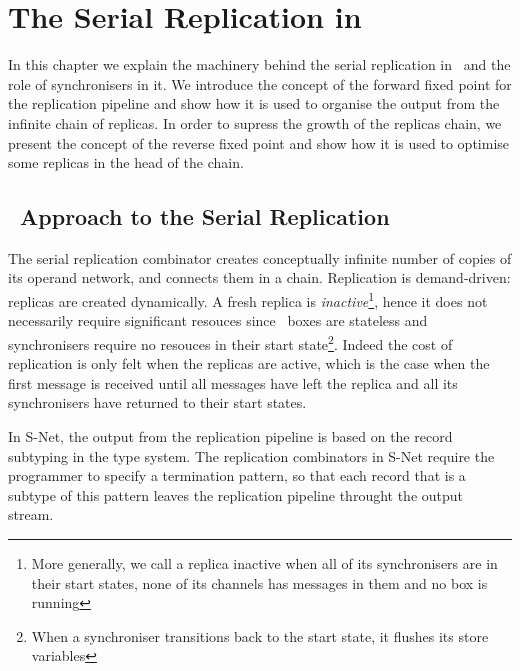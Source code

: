 \chapter{The Serial Replication in \ak\ }
In this chapter we explain the machinery behind the serial replication in \ak\ and the role of synchronisers in it. We introduce the concept of the forward fixed point for the replication pipeline and show how it is used to organise the output from the infinite chain of replicas. In order to supress the growth of the replicas chain, we present the concept of the reverse fixed point and show how it is used to optimise some replicas in the head of the chain.

%


    \section{\ak\ Approach to the Serial Replication}
The serial replication combinator creates conceptually infinite number of copies of its operand network, and connects them in a chain. Replication is demand-driven: replicas are created dynamically. A fresh replica is \emph{inactive}\footnote{More generally, we call a replica inactive when all of its synchronisers are in their start states, none of its channels has messages in them and no box is running}, hence it does not necessarily require significant resouces since \ak\ boxes are stateless and synchronisers require no resouces in their start state\footnote{When a synchroniser transitions back to the start state, it flushes its store variables}. Indeed the cost of replication is only felt when the replicas are active, which is the case when the first message is received until all messages have left the replica and all its synchronisers have returned to their start states.

In S-Net, the output from the replication pipeline is based on the record subtyping in the type system. The replication combinators in S-Net require the programmer to specify a termination pattern, so that each record that is a subtype of this pattern leaves the replication pipeline throught the output stream.


